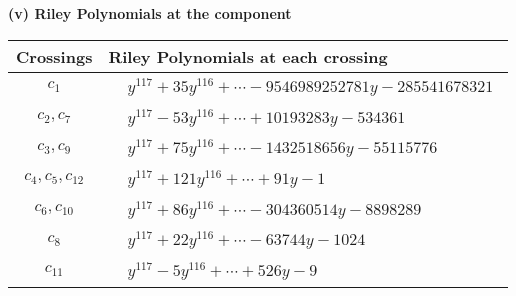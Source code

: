 \documentclass[1p]{elsarticle_modified}
\theoremstyle{definition}
\begin{document}
\newpage\renewcommand{\arraystretch}{1}
\flushleft \textbf{(v) Riley Polynomials at the component}\newline \\
\begin{tabular}{m{50pt}|m{274pt}}
Crossings & \hspace{64pt}Riley Polynomials at each crossing \\
\hline $$\begin{aligned}c_{1}\end{aligned}$$&$\begin{aligned}
&y^{117}+35 y^{116}+\cdots-9546989252781 y-285541678321
\end{aligned}$\\
\hline $$\begin{aligned}c_{2},c_{7}\end{aligned}$$&$\begin{aligned}
&y^{117}-53 y^{116}+\cdots+10193283 y-534361
\end{aligned}$\\
\hline $$\begin{aligned}c_{3},c_{9}\end{aligned}$$&$\begin{aligned}
&y^{117}+75 y^{116}+\cdots-1432518656 y-55115776
\end{aligned}$\\
\hline $$\begin{aligned}c_{4},c_{5},c_{12}\end{aligned}$$&$\begin{aligned}
&y^{117}+121 y^{116}+\cdots+91 y-1
\end{aligned}$\\
\hline $$\begin{aligned}c_{6},c_{10}\end{aligned}$$&$\begin{aligned}
&y^{117}+86 y^{116}+\cdots-304360514 y-8898289
\end{aligned}$\\
\hline $$\begin{aligned}c_{8}\end{aligned}$$&$\begin{aligned}
&y^{117}+22 y^{116}+\cdots-63744 y-1024
\end{aligned}$\\
\hline $$\begin{aligned}c_{11}\end{aligned}$$&$\begin{aligned}
&y^{117}-5 y^{116}+\cdots+526 y-9
\end{aligned}$\\
\hline
\end{tabular}\\~\\
\end{document}
